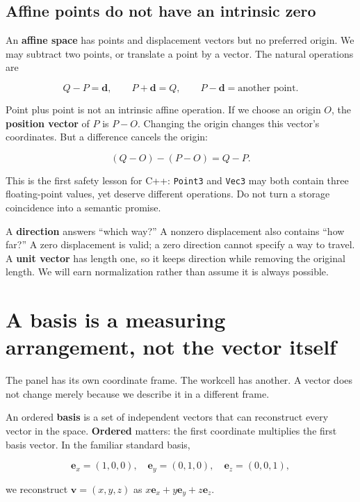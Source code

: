 \subsection{Affine points do not have an intrinsic zero}\label{01-foundations-i-ch017-affine-points-do-not-have-an-intrinsic-zero}

An \textbf{affine space} has points and displacement vectors but no preferred origin. We may subtract two points, or translate a point by a vector. The natural operations are

\[
Q-P=\mathbf d,\qquad P+\mathbf d=Q,\qquad P-\mathbf d=\text{another point}.
\]

Point plus point is not an intrinsic affine operation. If we choose an origin \(O\), the \textbf{position vector} of \(P\) is \(P-O\). Changing the origin changes this vector's coordinates. But a difference cancels the origin:

\[
(Q-O)-(P-O)=Q-P.
\]

This is the first safety lesson for C++: \texttt{Point3} and \texttt{Vec3} may both contain three floating-point values, yet deserve different operations. Do not turn a storage coincidence into a semantic promise.

A \textbf{direction} answers ``which way?'' A nonzero displacement also contains ``how far?'' A zero displacement is valid; a zero direction cannot specify a way to travel. A \textbf{unit vector} has length one, so it keeps direction while removing the original length. We will earn normalization rather than assume it is always possible.

\section{A basis is a measuring arrangement, not the vector itself}\label{01-foundations-i-ch017-a-basis-is-a-measuring-arrangement-not-the-vector-itself}

The panel has its own coordinate frame. The workcell has another. A vector does not change merely because we describe it in a different frame.

An ordered \textbf{basis} is a set of independent vectors that can reconstruct every vector in the space. \textbf{Ordered} matters: the first coordinate multiplies the first basis vector. In the familiar standard basis,

\[
\mathbf e_x=(1,0,0),\quad
\mathbf e_y=(0,1,0),\quad
\mathbf e_z=(0,0,1),
\]

we reconstruct \(\mathbf v=(x,y,z)\) as \(x\mathbf e_x+y\mathbf e_y+z\mathbf e_z\).

